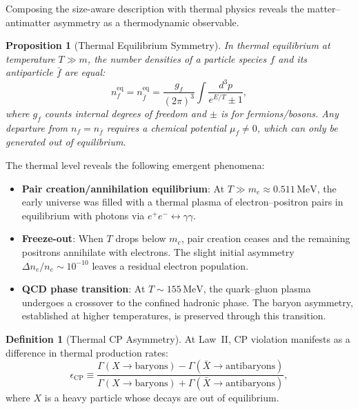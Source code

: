 \documentclass[12pt]{article}
\newtheorem{proposition}[theorem]{Proposition}
\theoremstyle{definition}
\newtheorem{definition}[theorem]{Definition}
\theoremstyle{remark}
\newcommand{\MeV}{\,\text{MeV}}
\begin{document}
Composing the size-aware description with thermal physics reveals the
matter--antimatter asymmetry as a thermodynamic observable.

\begin{proposition}[Thermal Equilibrium Symmetry]
\label{prop:thermal_symmetry}
In thermal equilibrium at temperature $T \gg m$, the number densities of a particle
species $f$ and its antiparticle $\bar{f}$ are equal:
\begin{equation}
n_f^{\text{eq}} = n_{\bar{f}}^{\text{eq}} = \frac{g_f}{(2\pi)^3} \int \frac{d^3p}{e^{E/T} \pm 1},
\end{equation}
where $g_f$ counts internal degrees of freedom and $\pm$ is for fermions/bosons.
Any departure from $n_f = n_{\bar{f}}$ requires a chemical potential $\mu_f \neq 0$,
which can only be generated out of equilibrium.
\end{proposition}

The thermal level reveals the following emergent phenomena:
\begin{itemize}
    \item \textbf{Pair creation/annihilation equilibrium}: At $T \gg m_e \approx 0.511\MeV$,
    the early universe was filled with a thermal plasma of electron--positron pairs in
    equilibrium with photons via $e^+e^- \leftrightarrow \gamma\gamma$.

    \item \textbf{Freeze-out}: When $T$ drops below $m_e$, pair creation ceases and
    the remaining positrons annihilate with electrons. The slight initial asymmetry
    $\Delta n_e / n_e \sim 10^{-10}$ leaves a residual electron population.

    \item \textbf{QCD phase transition}: At $T \sim 155\MeV$, the quark--gluon plasma
    undergoes a crossover to the confined hadronic phase. The baryon asymmetry, established
    at higher temperatures, is preserved through this transition.
\end{itemize}

\begin{definition}[Thermal CP Asymmetry]
\label{def:thermal_cp}
At Law~II, CP violation manifests as a difference in thermal production rates:
\begin{equation}
\epsilon_{\text{CP}} \equiv \frac{\Gamma(X \to \text{baryons}) - \Gamma(\bar{X} \to \text{antibaryons})}
{\Gamma(X \to \text{baryons}) + \Gamma(\bar{X} \to \text{antibaryons})},
\end{equation}
where $X$ is a heavy particle whose decays are out of equilibrium.
\end{definition}
\end{document}
